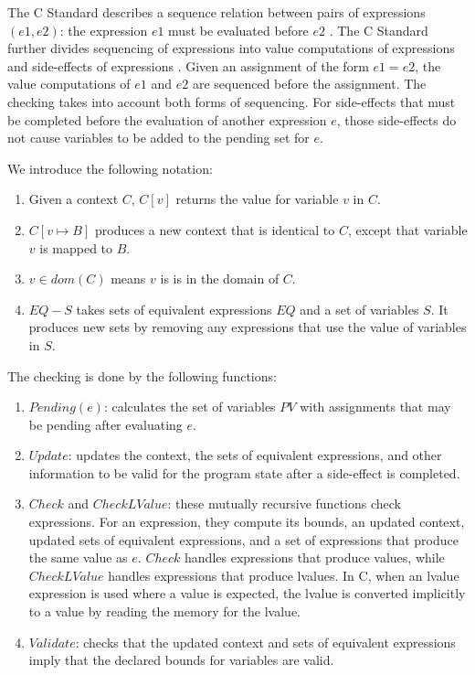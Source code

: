 The C Standard 
describes a sequence relation between pairs of expressions $(e1, e2)$:
the expression $e1$ must be evaluated before $e2$ \cite[Section 5.1.2.3]{ISO2011}.  
The C Standard
further divides sequencing of expressions into value computations
of expressions and side-effects of expressions \cite[Section 6.5, pars. 1,2]{ISO2011}.
Given an assignment of the form $e1 = e2$, 
the value computations of $e1$ and $e2$ are sequenced before the
assignment. The checking takes into account both forms of sequencing.
For side-effects that must be completed before the evaluation of another
expression $e$, those side-effects do not cause variables to
be added to the pending set for $e$.

We introduce the following notation:
\begin{enumerate}
\item Given a context $C$, $C[v]$ returns the value for variable $v$ in $C$.
\item $C[v \mapsto B]$ produces a new context that is identical to $C$,
except that variable $v$ is mapped to $B$.
\item $v \in dom(C)$ means $v$ is is in the domain of $C$.
\item $EQ - S$ takes sets of equivalent expressions $EQ$  and a set of variables
$S$.  It produces new sets by removing any expressions that use the value 
of variables in $S$.
\end{enumerate}

The checking is done by the following functions:
\begin{enumerate}
\item $Pending(e)$: calculates the set of variables $PV$
with assignments that may be pending after evaluating $e$. 
\item $Update$: updates the context, the sets of equivalent expressions,
and other information to be valid for the program state after
a side-effect is completed.
\item $Check$ and $CheckLValue$:  these mutually recursive
functions check expressions.  For an expression, they compute
its bounds, an updated context, updated sets of equivalent expressions,
and a set of expressions that produce the same value as $e$.
$Check$ handles expressions that
produce values, while $CheckLValue$ handles expressions that produce
lvalues.  In C, when an lvalue expression is used where a value is
expected, the lvalue is converted implicitly to a value by
reading the memory for the lvalue.
\item $Validate$: checks that the updated context
and sets of equivalent expressions imply that the declared bounds for
variables are valid.
\end{enumerate}

